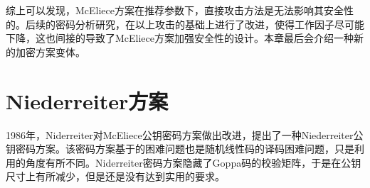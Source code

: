 \begin{table}[H]
\centering
{}
\caption{常见攻击工作因子}\label{wf_table}
\end{table}
综上可以发现，McEliece方案在推荐参数下，直接攻击方法是无法影响其安全性的。后续的密码分析研究，在以上攻击的基础上进行了改进，使得工作因子尽可能下降，这也间接的导致了McEliece方案加强安全性的设计。本章最后会介绍一种新的加密方案变体。

\section{Niederreiter方案}
1986年，Niderreiter对McEliece公钥密码方案做出改进，提出了一种Niederreiter公钥密码方案。该密码方案基于的困难问题也是随机线性码的译码困难问题，只是利用的角度有所不同。Niderreiter密码方案隐藏了Goppa码的校验矩阵，于是在公钥尺寸上有所减少，但是还是没有达到实用的要求。

